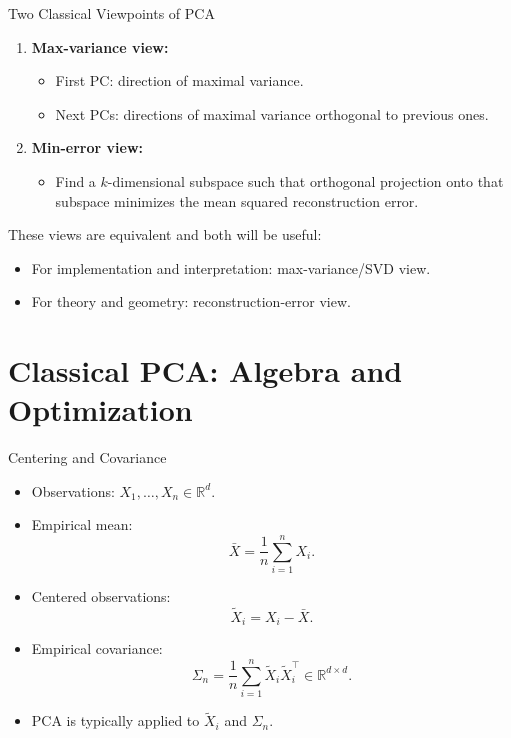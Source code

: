 \documentclass{beamer}
\newcommand{\R}{\mathbb{R}}
\newcommand{\1}{\mathbbm{1}}
\begin{document}
\begin{frame}{Two Classical Viewpoints of PCA} %
  \begin{enumerate}[(1)]
    \item \textbf{Max-variance view:}
    \begin{itemize}
      \item First PC: direction of maximal variance.
      \item Next PCs: directions of maximal variance orthogonal to previous ones.
    \end{itemize}
    \item \textbf{Min-error view:}
    \begin{itemize}
      \item Find a $k$-dimensional subspace such that
      orthogonal projection onto that subspace minimizes
      the mean squared reconstruction error.
    \end{itemize}
  \end{enumerate}
  \vspace{0.2cm}
  These views are equivalent and both will be useful:
  \begin{itemize}
    \item For implementation and interpretation: max-variance/SVD view.
    \item For theory and geometry: reconstruction-error view.
  \end{itemize}
\end{frame}

\section{Classical PCA: Algebra and Optimization}

\begin{frame}{Centering and Covariance} %
  \begin{itemize}
    \item Observations: $X_1,\dots,X_n \in \R^d$.
    \item Empirical mean:
    \[
      \bar{X} = \frac{1}{n}\sum_{i=1}^n X_i.
    \]
    \item Centered observations:
    \[
      \tilde{X}_i = X_i - \bar{X}.
    \]
    \item Empirical covariance:
    \[
      \Sigma_n = \frac{1}{n}\sum_{i=1}^n \tilde{X}_i \tilde{X}_i^\top
      \in \R^{d\times d}.
    \]
    \item PCA is typically applied to $\tilde{X}_i$ and $\Sigma_n$.
  \end{itemize}
\end{frame}
\end{document}
